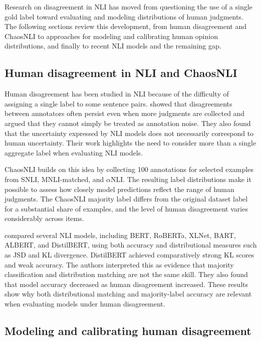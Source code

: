 \documentclass[11pt,a4paper]{article}
\begin{document}
Research on disagreement in NLI has moved from questioning the use of a single gold label toward evaluating and modeling distributions of human judgments. The following sections review this development, from human disagreement and ChaosNLI to approaches for modeling and calibrating human opinion distributions, and finally to recent NLI models and the remaining gap.

\subsection{Human disagreement in NLI and ChaosNLI}

Human disagreement has been studied in NLI because of the difficulty of assigning a single label to some sentence pairs. \citet{pavlick2019inherent} showed that disagreements between annotators often persist even when more judgments are collected and argued that they cannot simply be treated as annotation noise. They also found that the uncertainty expressed by NLI models does not necessarily correspond to human uncertainty. Their work highlights the need to consider more than a single aggregate label when evaluating NLI models.

ChaosNLI \citep{nie2020chaosnli} builds on this idea by collecting 100 annotations for selected examples from SNLI, MNLI-matched, and $\alpha$NLI. The resulting label distributions make it possible to assess how closely model predictions reflect the range of human judgments. The ChaosNLI majority label differs from the original dataset label for a substantial share of examples, and the level of human disagreement varies considerably across items.

\citet{nie2020chaosnli} compared several NLI models, including BERT, RoBERTa, XLNet, BART, ALBERT, and DistilBERT, using both accuracy and distributional measures such as JSD and KL divergence. DistilBERT achieved comparatively strong KL scores and weak accuracy. The authors interpreted this as evidence that majority classification and distribution matching are not the same skill. They also found that model accuracy decreased as human disagreement increased. These results show why both distributional matching and majority-label accuracy are relevant when evaluating models under human disagreement.

\subsection{Modeling and calibrating human disagreement}
\end{document}
